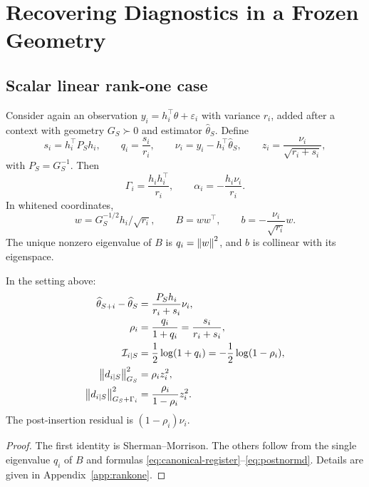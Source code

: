 \section{Recovering Diagnostics in a Frozen Geometry}
\subsection{Scalar linear rank-one case}
\label{subsec:rankone-recovery}
Consider again an observation $y_i=h_i^\top\theta+\varepsilon_i$ with variance $r_i$, added after a context with geometry $G_S\succ0$ and estimator $\widehat\theta_S$. Define
\begin{equation}
s_i=h_i^\top P_Sh_i,
\qquad
q_i=\frac{s_i}{r_i},
\qquad
\nu_i=y_i-h_i^\top\widehat\theta_S,
\qquad
z_i=\frac{\nu_i}{\sqrt{r_i+s_i}},
\label{eq:q-z}
\end{equation}
with $P_S=G_S^{-1}$. Then
\[
\Gamma_i=\frac{h_ih_i^\top}{r_i},
\qquad
\alpha_i=-\frac{h_i\nu_i}{r_i}.
\]
In whitened coordinates,
\[
w=G_S^{-1/2}h_i/\sqrt{r_i},
\qquad
B=ww^\top,
\qquad
b=-\frac{\nu_i}{\sqrt{r_i}}w.
\]
The unique nonzero eigenvalue of $B$ is $q_i=\left\lVert w\right\rVert^2$, and $b$ is collinear with its eigenspace.

\begin{theorem}
In the setting above:
\begin{align}
\widehat\theta_{S+i}-\widehat\theta_S
&=\frac{P_Sh_i}{r_i+s_i}\nu_i,\label{eq:rankone-d}\\
\rho_i
&=\frac{q_i}{1+q_i}=\frac{s_i}{r_i+s_i},\label{eq:rho}\\
\mathcal I_{i\mid S}
&=\frac12\log(1+q_i)=-\frac12\log(1-\rho_i),\label{eq:rankone-info}\\
\left\lVert d_{i\mid S}\right\rVert_{G_S}^2
&=\rho_i z_i^2,\label{eq:rankone-contextnorm}\\
\left\lVert d_{i\mid S}\right\rVert_{G_S+\Gamma_i}^2
&=\frac{\rho_i}{1-\rho_i}z_i^2.\label{eq:rankone-postnorm}
\end{align}
The post-insertion residual is $(1-\rho_i)\nu_i$.
\end{theorem}

\begin{proof}
The first identity is Sherman--Morrison. The others follow from the single eigenvalue $q_i$ of $B$ and formulas \eqref{eq:canonical-register}--\eqref{eq:postnormd}. Details are given in Appendix~\ref{app:rankone}.
\end{proof}


